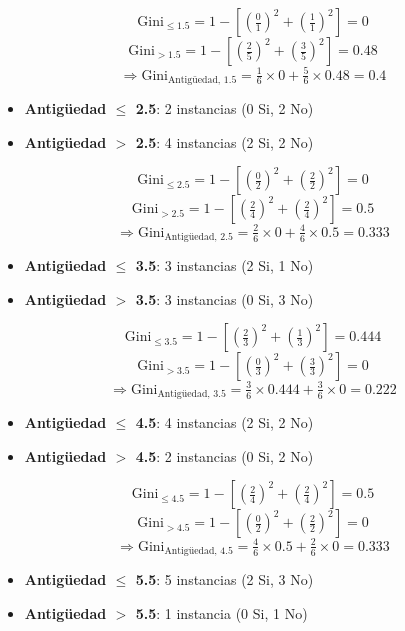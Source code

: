 \documentclass[12pt]{article}
\begin{document}
\[
  \mathrm{Gini}_{\le1.5} = 1 - \left[\left(\tfrac{0}{1}\right)^2 + \left(\tfrac{1}{1}\right)^2\right] = 0
\]
\[
  \mathrm{Gini}_{>1.5} = 1 - \left[\left(\tfrac{2}{5}\right)^2 + \left(\tfrac{3}{5}\right)^2\right] = 0.48
\]
\[
  \Rightarrow \mathrm{Gini}_{\text{Antigüedad, 1.5}} = \tfrac{1}{6}\times0 + \tfrac{5}{6}\times0.48 = 0.4
\]

\begin{itemize}
  \item \textbf{Antigüedad $\leq$ 2.5}: 2 instancias (0 Si, 2 No)
  \item \textbf{Antigüedad $>$ 2.5}: 4 instancias (2 Si, 2 No)
\end{itemize}

\[
  \mathrm{Gini}_{\le2.5} = 1 - \left[\left(\tfrac{0}{2}\right)^2 + \left(\tfrac{2}{2}\right)^2\right] = 0
\]
\[
  \mathrm{Gini}_{>2.5} = 1 - \left[\left(\tfrac{2}{4}\right)^2 + \left(\tfrac{2}{4}\right)^2\right] = 0.5
\]
\[
  \Rightarrow \mathrm{Gini}_{\text{Antigüedad, 2.5}} = \tfrac{2}{6}\times0 + \tfrac{4}{6}\times0.5 = 0.333
\]

\begin{itemize}
  \item \textbf{Antigüedad $\leq$ 3.5}: 3 instancias (2 Si, 1 No)
  \item \textbf{Antigüedad $>$ 3.5}: 3 instancias (0 Si, 3 No)
\end{itemize}

\[
  \mathrm{Gini}_{\le3.5} = 1 - \left[\left(\tfrac{2}{3}\right)^2 + \left(\tfrac{1}{3}\right)^2\right] = 0.444
\]
\[
  \mathrm{Gini}_{>3.5} = 1 - \left[\left(\tfrac{0}{3}\right)^2 + \left(\tfrac{3}{3}\right)^2\right] = 0
\]
\[
  \Rightarrow \mathrm{Gini}_{\text{Antigüedad, 3.5}} = \tfrac{3}{6}\times0.444 + \tfrac{3}{6}\times0 = 0.222
\]

\begin{itemize}
  \item \textbf{Antigüedad $\leq$ 4.5}: 4 instancias (2 Si, 2 No)
  \item \textbf{Antigüedad $>$ 4.5}: 2 instancias (0 Si, 2 No)
\end{itemize}

\[
  \mathrm{Gini}_{\le4.5} = 1 - \left[\left(\tfrac{2}{4}\right)^2 + \left(\tfrac{2}{4}\right)^2\right] = 0.5
\]
\[
  \mathrm{Gini}_{>4.5} = 1 - \left[\left(\tfrac{0}{2}\right)^2 + \left(\tfrac{2}{2}\right)^2\right] = 0
\]
\[
  \Rightarrow \mathrm{Gini}_{\text{Antigüedad, 4.5}} = \tfrac{4}{6}\times0.5 + \tfrac{2}{6}\times0 = 0.333
\]

\begin{itemize}
  \item \textbf{Antigüedad $\leq$ 5.5}: 5 instancias (2 Si, 3 No)
  \item \textbf{Antigüedad $>$ 5.5}: 1 instancia (0 Si, 1 No)
\end{itemize}
\end{document}
